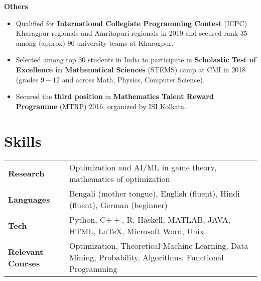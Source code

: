 \vspace{\mygap}
\resumeProjectHeading
{\textbf{Others}}
{}
{
\item 
\begin{itemize}[itemsep=-4pt, parsep=5pt, leftmargin=0.5cm]
\item {}  Qualified for \textbf{International Collegiate Programming Contest} (ICPC) Kharagpur regionals and Amritapuri regionals in 2019 and secured rank $35$ among (approx) $90$ university teams at Kharagpur.
\item Selected among top $30$ students in India to participate in \textbf{Scholastic Test of Excellence in Mathematical Sciences} (STEMS) camp at CMI in 2018 (grades $9-12$ and across Math, Physics, Computer Science).
\item Secured the \textbf{third position} in \textbf{Mathematics Talent Reward Programme} (MTRP) 2016, organized by ISI Kolkata.\end{itemize}}
\resumeSubHeadingListEnd
\vspace{\mygap}


\section{Skills}
\vspace{-2pt}
\begin{tabular*}{\textwidth}{l @{\hskip 0.5in} l}
\textbf{Research} & Optimization and AI/ML in game theory, mathematics of optimization\\
\textbf{Languages} & Bengali (mother tongue), English (fluent), Hindi (fluent), German (beginner)\\
\textbf{Tech}  & {Python, C$++$, R, Haskell,  MATLAB, JAVA, HTML, \LaTeX, Microsoft Word, Unix} \\
\textbf{Relevant Courses}
  & {Optimization, Theoretical Machine Learning, Data Mining, Probability, Algorithms, Functional Programming} \\
\end{tabular*}
\vspace{-15pt}







